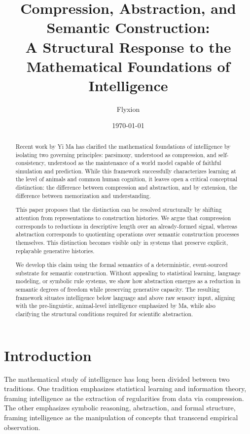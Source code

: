 \documentclass[11pt]{article}
\title{Compression, Abstraction, and Semantic Construction:\\
A Structural Response to the Mathematical Foundations of Intelligence}
\author{Flyxion}
\date{\today}
\begin{document}
\maketitle

\begin{abstract}

Recent work by Yi Ma has clarified the mathematical foundations of
intelligence by isolating two governing principles: parsimony, understood
as compression, and self-consistency, understood as the maintenance of a
world model capable of faithful simulation and prediction. While this
framework successfully characterizes learning at the level of animals and
common human cognition, it leaves open a critical conceptual distinction:
the difference between compression and abstraction, and by extension, the
difference between memorization and understanding.

This paper proposes that the distinction can be resolved structurally by
shifting attention from representations to construction histories. We
argue that compression corresponds to reductions in descriptive length
over an already-formed signal, whereas abstraction corresponds to
quotienting operations over semantic construction processes themselves.
This distinction becomes visible only in systems that preserve explicit,
replayable generative histories.

We develop this claim using the formal semantics of a deterministic,
event-sourced substrate for semantic construction. Without appealing to
statistical learning, language modeling, or symbolic rule systems, we show
how abstraction emerges as a reduction in semantic degrees of freedom
while preserving generative capacity. The resulting framework situates
intelligence below language and above raw sensory input, aligning with the
pre-linguistic, animal-level intelligence emphasized by Ma, while also
clarifying the structural conditions required for scientific abstraction.

\end{abstract}

\section{Introduction}

The mathematical study of intelligence has long been divided between two
traditions. One tradition emphasizes statistical learning and information
theory, framing intelligence as the extraction of regularities from data
via compression. The other emphasizes symbolic reasoning, abstraction, and
formal structure, framing intelligence as the manipulation of concepts
that transcend empirical observation.
\end{document}
